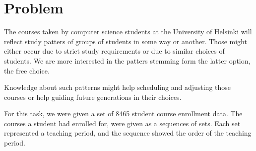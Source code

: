 \section{Problem}

The courses taken by computer science students at the University of Helsinki will reflect study patters of groups of students in some way or another.
Those might either occur due to strict study requirements or due to similar choices of students. We are more interested in the patters stemming form the latter option, the free choice.

Knowledge about such patterns might help scheduling and adjusting those courses or help guiding future generations in their choices.

For this task, we were given a set of 8465 student course enrollment data. The courses a student had enrolled for, were given as a sequences of sets. Each set represented a teaching period, and the sequence showed the order of the teaching period.

